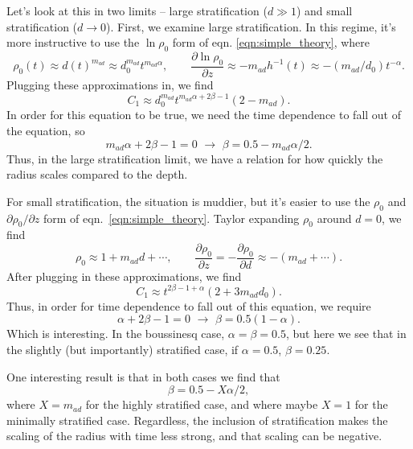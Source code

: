 \documentclass[onecolumn, amsmath, amsfonts, amssymb]{aastex62}
\begin{document}
Let's look at this in two limits -- large stratification ($d \gg 1$) and small stratification ($d \rightarrow 0$). 
First, we examine large stratification. 
In this regime, it's more instructive to use the $\ln \rho_0$ form of
eqn. \ref{eqn:simple_theory}, where
\begin{equation}
\rho_0(t) \approx 
d(t)^{m_{ad}} \approx d_0^{m_{ad}} t^{m_{ad}\alpha},
\qquad
\frac{\partial \ln \rho_0}{\partial z} \approx 
-m_{ad} h^{-1}(t) \approx -(m_{ad}/d_0) t^{-\alpha}.
\end{equation}
Plugging these approximations in, we find
$$
C_1 \approx d_0^{m_{ad}} t^{m_{ad}\alpha + 2\beta - 1}(2 - m_{ad}).
$$
In order for this equation to be true, we need the time dependence to fall out of the
equation, so
\begin{equation}
m_{ad}\alpha + 2\beta - 1 = 0\,\,\rightarrow\,\, \beta = 0.5 - m_{ad} \alpha / 2.
\end{equation}
Thus, in the large stratification limit, we have a relation for how quickly the
radius scales compared to the depth.

For small stratification, the situation is muddier, but it's easier to use the $\rho_0$
and $\partial \rho_0 / \partial z$ form of eqn.~\ref{eqn:simple_theory}. Taylor expanding
$\rho_0$ around $d = 0$, we find
$$
\rho_0 \approx 1 + m_{ad} d + \cdots, \qquad 
\frac{\partial \rho_0}{\partial z} = -\frac{\partial \rho_0}{\partial d} \approx -(m_{ad} + \cdots) .
$$
After plugging in these approximations, we find
$$
C_1 \approx t^{2\beta - 1 + \alpha}(2 + 3m_{ad} d_0).
$$
Thus, in order for time dependence to fall out of this equation, we require
\begin{equation}
\alpha + 2\beta - 1 = 0\,\,\rightarrow\,\, \beta = 0.5 (1 -  \alpha).
\end{equation}
Which is interesting. In the boussinesq case, $\alpha = \beta = 0.5$, but here we see
that in the slightly (but importantly) stratified case, if $\alpha = 0.5$, $\beta = 0.25$.

 
One interesting result is that in both cases we find that
$$
\beta = 0.5 - X \alpha / 2,
$$
where $X = m_{ad}$ for the highly stratified case, and where maybe $X = 1$ for the minimally
stratified case. Regardless, the inclusion of stratification makes the scaling of the radius with
time less strong, and that scaling can be negative.


\end{document}
